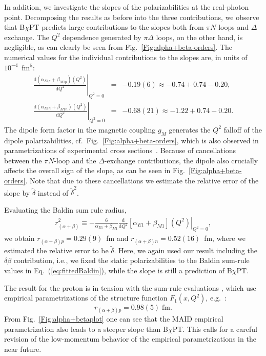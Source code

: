 \documentclass[12pt,preprint,tightenlines,
showpacs,preprintnumbers,amsmath,amssymb,
a4paper,nofootinbib]{revtex4-2}
\def\beq{\begin{equation}}
\def\eeq{\end{equation}}
\def\bea{\begin{eqnarray}}
\def\eea{\end{eqnarray}}
\def\Eqref#1{Eq.~(\ref{eq:#1})}
\def\dd{\mathrm{d}}
\begin{document}
In addition, we investigate the slopes of the polarizabilities at the real-photon point. Decomposing the results as before into the three contributions, we observe that B$\chi$PT predicts large contributions to the slopes both from $\pi N$ loops and $\Delta$ exchange. The $Q^2$ dependence generated by $\pi \Delta$ loops, on the other hand, is negligible,
as can  clearly be seen from Fig.~\ref{Fig:alpha+beta-orders}. The numerical values for the individual contributions to the slopes are, in units of $10^{-4}$~fm$^5$:
\begin{subequations}
\bea
\left.\frac{\dd(\alpha_{E1p} + \beta_{M1p}) (Q^2)}{\dd Q^2}\right|_{Q^2=0}&=&-0.19(6)\approx -0.74  + 0.74-0.20 ,\\
\left.\frac{\dd(\alpha_{E1n} + \beta_{M1n}) (Q^2)}{\dd Q^2}\right|_{Q^2=0}&=& -0.68(21)\approx-1.22  +0.74-0.20.
\eea
\end{subequations}
 The dipole form factor in the magnetic coupling $g_M$ generates the $Q^2$ falloff of the dipole polarizabilities, cf.\ Fig.~\ref{Fig:alpha+beta-orders}, which is also observed
in parametrizations of experimental cross sections~\cite{Hall:2014lea}. 
Because of cancellations between the $\pi N$-loop and the $\Delta$-exchange contributions,
 the dipole also crucially affects the overall sign of the slope, as can be seen in Fig.~\ref{Fig:alpha+beta-orders}. Note that due to these cancellations we estimate the relative error
 of the slope by $\tilde{\delta}$ instead of $\tilde{\delta}^2$.


Evaluating the Baldin sum rule radius, 
\begin{align}\label{Eq:r2alphabetaDef}
r_{(\alpha+\beta)}^2\equiv - \frac{6}{\alpha_{E1}+\beta_{M1}}\left.\frac{\dd}{\dd Q^2}[\alpha_{E1}+\beta_{M1}](Q^2)\right|_{Q^2=0},
\end{align}
we obtain $r_{(\alpha+\beta)p}= 0.29(9)$~fm and $r_{(\alpha+\beta)n}=0.52(16)$~fm, 
where we estimated the relative error to be $\tilde{\delta}$. Here, we again used our result including the $\delta \beta$ contribution, i.e., we fixed the static polarizabilities to the Baldin sum-rule values in \Eqref{fittedBaldin}, while the slope is still a prediction of B$\chi$PT. 

The result for the proton is in tension with the sum-rule evaluations \cite{Liang:2004tk,Sibirtsev:2013cga,Hall:2014lea}, which use  empirical parametrizations of the structure function $F_1(x,Q^2)$, e.g.~\cite{Hall:2014lea}: 
\beq r_{(\alpha+\beta)p}=0.98(5)  \; \mbox{fm}.
\eeq 
From Fig.~\ref{Fig:alpha+betaplot} one can see that the MAID empirical parametrization also leads to a steeper slope than B$\chi$PT.
This calls for a careful revision of the low-momentum behavior of the empirical
parametrizations in the near future.
\end{document}
